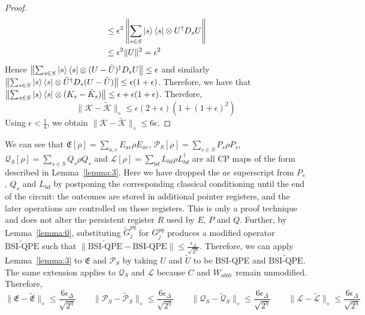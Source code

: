 \documentclass[aps,floatfix,10pt,amssymb,amsfont,amsmath,superscriptaddress,float,nofootinbib,longbibliography,nobalancelastpage,twocolumn]{revtex4-2}
\begin{document}
\begin{widetext}
\begin{proof}
\begin{align}
    & \leq \epsilon^2\left\|\sum_{s\in S}\ket{s}\bra{s}\otimes U^{\dagger}D_s U\right\|\\
    & \leq \epsilon^2 \|U\|^2 =\epsilon^2  
\end{align}
Hence $\left\|\sum_{s\in S}\ket{s}\bra{s}\otimes (U-\tilde U)^{\dagger}  D_s U\right\| \leq \epsilon $ and similarly $\left\|\sum_{s\in S}\ket{s}\bra{s}\otimes\tilde U^{\dagger}  D_s (U-\tilde U)\right\| \leq \epsilon (1+\epsilon)$. Therefore, we have that $\left\|\sum_{s\in S}\ket{s}\bra{s}\otimes(K_s-\tilde K_s)\right\| \leq \epsilon + \epsilon(1+\epsilon)$. Therefore,
\begin{equation}
    \|\mathcal{K} - \tilde{\mathcal{K}}\|_{\diamond} \leq \epsilon(2+\epsilon)(1+(1+\epsilon)^2)
\end{equation}
Using $\epsilon<\frac14$, we obtain $\|\mathcal{K} - \tilde {\mathcal{K}}\|_{\diamond} \leq 6\epsilon$.
\end{proof}
We can see that $\mathfrak{E}[\rho] = \sum_{a,e} E_{ae} \rho E_{ae}$, $\mathcal{P}_S[\rho] = \sum_{s\in S} P_s \rho P_s$, $\mathcal{Q}_S[\rho] = \sum_{s\in S} Q_s \rho Q_s$ and $\mathcal{L}[\rho] = \sum_{bd} L_{bd} \rho L^{\dagger}_{bd}$ are all CP maps of the form described in Lemma~\ref{lemma:3}. Here we have dropped the $ae$ superscript from $P_s$, $Q_s$ and $L_{bd}$ by postponing the corresponding classical conditioning until the end of the circuit: the outcomes are stored in additional pointer registers, and the later operations are controlled on those registers. This is only a proof technique and does not alter the persistent register $R$ used by $E$, $P$ and $Q$. Further, by Lemma~\ref{lemma:0}, substituting $\tilde G^{pq}_j$ for $G^{pq}_j$ produces a modified operator $\widetilde{\text{BSI-QPE}}$ such that $\|\widetilde{\text{BSI-QPE}}- \text{BSI-QPE}\| \leq \frac{\epsilon_{\Delta}}{\sqrt{2^{\eta}}}$. Therefore, we can apply Lemma~\ref{lemma:3} to $\mathfrak{E}$ and $\mathcal{P}_S$ by taking $U$ and $\tilde U$ to be BSI-QPE and $\widetilde{\text{BSI-QPE}}$. The same extension applies to $\mathcal{Q}_S$ and $\mathcal{L}$ because $C$ and $W_{abde}$ remain unmodified. Therefore,
\begin{equation}
    \|\mathfrak{E} - \tilde{\mathfrak{E}}\|_{\diamond} \leq \frac{6\epsilon_{\Delta}}{\sqrt{2^{\eta}}} \qquad\|\mathcal{P}_S - \tilde{\mathcal{P}}_S\|_{\diamond} \leq \frac{6\epsilon_{\Delta}}{\sqrt{2^{\eta}}} \qquad\|\mathcal{Q}_S - \tilde{\mathcal{Q}}_S\|_{\diamond} \leq \frac{6\epsilon_{\Delta}}{\sqrt{2^{\eta}}}  \qquad\|\mathcal{L} - \tilde{\mathcal{L}}\|_{\diamond} \leq \frac{6\epsilon_{\Delta}}{\sqrt{2^{\eta}}} 

\end{equation}
\end{widetext}
\end{document}

